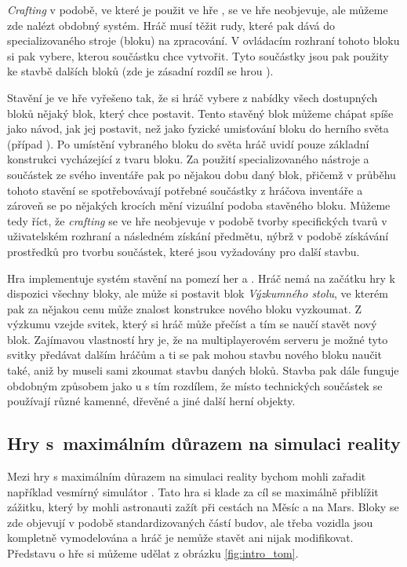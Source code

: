 \textit{Crafting} v podobě, ve které je použit ve hře \MC{}, se ve hře \SE{} neobjevuje, ale můžeme zde nalézt obdobný systém. Hráč musí těžit rudy, které pak dává do specializovaného stroje (bloku) na zpracování. V ovládacím rozhraní tohoto bloku si pak vybere, kterou součástku chce vytvořit. Tyto součástky jsou pak použity ke stavbě dalších bloků (zde je zásadní rozdíl se hrou \MC{}).

Stavění je ve hře \SE{} vyřešeno tak, že si hráč vybere z nabídky všech dostupných bloků nějaký blok, který chce postavit. Tento stavěný blok můžeme chápat spíše jako návod, jak jej postavit, než jako fyzické umisťování bloku do herního světa (případ ). Po umístění vybraného bloku do světa hráč uvidí pouze základní konstrukci vycházející z tvaru bloku. Za použití specializovaného nástroje a součástek ze svého inventáře pak po nějakou dobu  daný blok, přičemž v průběhu tohoto stavění se spotřebovávají potřebné součástky z hráčova inventáře a zároveň se po nějakých krocích mění vizuální podoba stavěného bloku. Můžeme tedy říct, že \textit{crafting} se ve hře \SE{} neobjevuje v podobě tvorby specifických tvarů v uživatelském rozhraní a následném získání předmětu, nýbrž v podobě získávání prostředků pro tvorbu součástek, které jsou vyžadovány pro další stavbu.

Hra \ME{} implementuje systém stavění na pomezí her \MC{} a \SE{}. Hráč nemá na začátku hry k dispozici všechny bloky, ale může si postavit blok \textit{Výzkumného stolu}, ve kterém pak za nějakou cenu může znalost konstrukce nového bloku vyzkoumat. Z výzkumu vzejde svitek, který si hráč může přečíst a tím se naučí stavět nový blok. Zajímavou vlastností hry je, že na multiplayerovém serveru je možné tyto svitky předávat dalším hráčům a ti se pak mohou stavbu nového bloku naučit také, aniž by museli sami zkoumat stavbu daných bloků. Stavba pak dále funguje obdobným způsobem jako u \SE{} s tím rozdílem, že místo technických součástek se používají různé kamenné, dřevěné a jiné další herní objekty. 




\subsection{Hry s~maximálním důrazem na simulaci reality}

Mezi hry s maximálním důrazem na simulaci reality bychom mohli zařadit například vesmírný simulátor \TM{}. Tato hra si klade za cíl se maximálně přiblížit zážitku, který by mohli astronauti zažít při cestách na Měsíc a na Mars. Bloky se zde objevují v podobě standardizovaných částí budov, ale třeba vozidla jsou kompletně vymodelována a hráč je nemůže stavět ani nijak modifikovat. Představu o hře si můžeme udělat z obrázku \ref{fig:intro_tom}.


